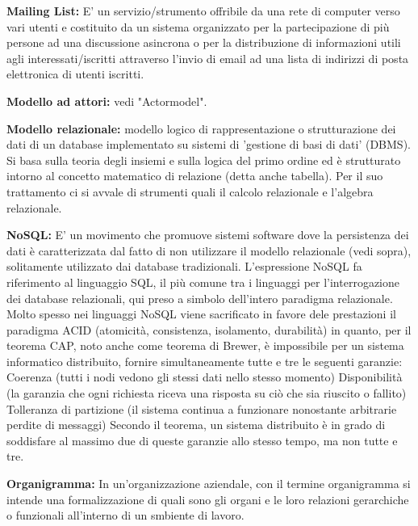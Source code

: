 \documentclass{scalatekids-article}
\begin{document}


\textbf{Mailing List:} E' un servizio/strumento offribile da una rete di computer verso vari utenti e costituito da un sistema organizzato per la partecipazione di più persone ad una discussione asincrona o per la distribuzione di informazioni utili agli interessati/iscritti attraverso l'invio di email ad una lista di indirizzi di posta elettronica di utenti iscritti.

\textbf{Modello ad attori:} vedi "Actormodel".

\textbf{Modello relazionale:} modello logico di rappresentazione o strutturazione dei dati di un database implementato su sistemi di 'gestione di basi di dati' (DBMS).
Si basa sulla teoria degli insiemi e sulla logica del primo ordine ed è strutturato intorno al concetto matematico di relazione (detta anche tabella). Per il suo trattamento ci si avvale di strumenti quali il calcolo relazionale e l'algebra relazionale.


\textbf{NoSQL:} E' un movimento che promuove sistemi software dove la persistenza dei dati è caratterizzata dal fatto di non utilizzare il modello relazionale (vedi sopra), solitamente utilizzato dai database tradizionali.
L'espressione NoSQL fa riferimento al linguaggio SQL, il più comune tra i linguaggi per l'interrogazione dei database relazionali, qui preso a simbolo dell'intero paradigma relazionale. Molto spesso nei linguaggi NoSQL viene sacrificato in favore dele prestazioni il paradigma ACID (atomicità, consistenza, isolamento, durabilità) in quanto, per il teorema CAP, noto anche come teorema di Brewer, è impossibile per un sistema informatico distribuito, fornire simultaneamente tutte e tre le seguenti garanzie:
Coerenza (tutti i nodi vedono gli stessi dati nello stesso momento)
Disponibilità (la garanzia che ogni richiesta riceva una risposta su ciò che sia riuscito o fallito)
Tolleranza di partizione (il sistema continua a funzionare nonostante arbitrarie perdite di messaggi)
Secondo il teorema, un sistema distribuito è in grado di soddisfare al massimo due di queste garanzie allo stesso tempo, ma non tutte e tre.


\textbf{Organigramma:} In un'organizzazione aziendale, con il termine organigramma si intende una formalizzazione di quali sono gli organi e le loro relazioni gerarchiche o funzionali all'interno di un smbiente di lavoro.
\end{document}

